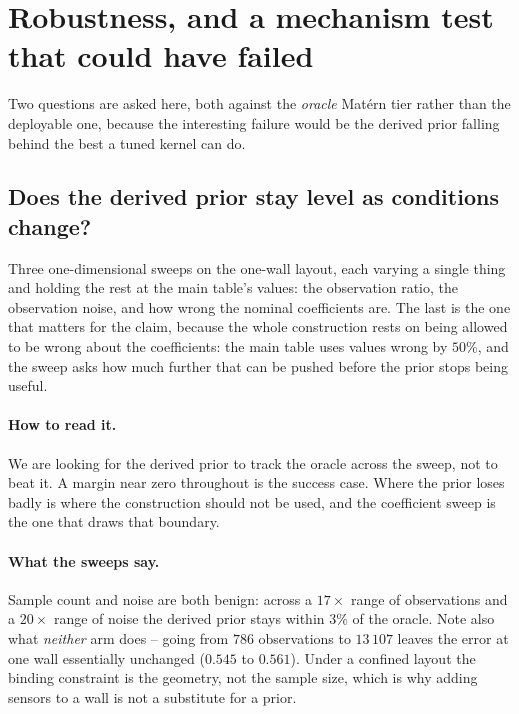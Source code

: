 \section{Robustness, and a mechanism test that could have failed}
\label{app:robustness}

Two questions are asked here, both against the \emph{oracle} Mat\'ern tier rather
than the deployable one, because the interesting failure would be the derived
prior falling behind the best a tuned kernel can do.

\subsection{Does the derived prior stay level as conditions change?}
Three one-dimensional sweeps on the one-wall layout, each varying a single thing
and holding the rest at the main table's values: the observation ratio, the
observation noise, and how wrong the nominal coefficients are.  The last is the
one that matters for the claim, because the whole construction rests on being
allowed to be wrong about the coefficients: the main table uses values wrong by
$50\%$, and the sweep asks how much further that can be pushed before the prior
stops being useful.



\paragraph{How to read it.}  We are looking for the derived prior to track the
oracle across the sweep, not to beat it.  A margin near zero throughout is the
success case.  Where the prior loses badly is where the construction should not
be used, and the coefficient sweep is the one that draws that boundary.

\paragraph{What the sweeps say.}  Sample count and noise are both benign: across
a $17\times$ range of observations and a $20\times$ range of noise the derived
prior stays within $3\%$ of the oracle.  Note also what \emph{neither} arm does
-- going from $786$ observations to $13\,107$ leaves the error at one wall
essentially unchanged ($0.545$ to $0.561$).  Under a confined layout the binding
constraint is the geometry, not the sample size, which is why adding sensors to
a wall is not a substitute for a prior.

